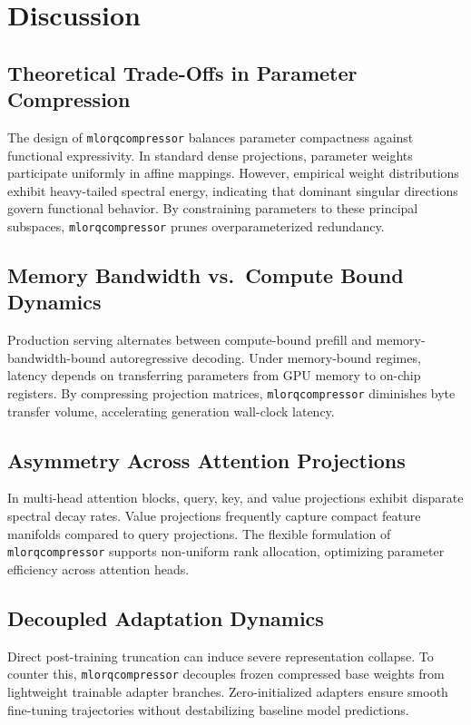 \section{Discussion}

\subsection{Theoretical Trade-Offs in Parameter Compression}
The design of \texttt{mlorqcompressor} balances parameter compactness against functional expressivity. In standard dense projections, parameter weights participate uniformly in affine mappings. However, empirical weight distributions exhibit heavy-tailed spectral energy, indicating that dominant singular directions govern functional behavior. By constraining parameters to these principal subspaces, \texttt{mlorqcompressor} prunes overparameterized redundancy.

\subsection{Memory Bandwidth vs.\ Compute Bound Dynamics}
Production serving alternates between compute-bound prefill and memory-bandwidth-bound autoregressive decoding. Under memory-bound regimes, latency depends on transferring parameters from GPU memory to on-chip registers. By compressing projection matrices, \texttt{mlorqcompressor} diminishes byte transfer volume, accelerating generation wall-clock latency.

\subsection{Asymmetry Across Attention Projections}
In multi-head attention blocks, query, key, and value projections exhibit disparate spectral decay rates. Value projections frequently capture compact feature manifolds compared to query projections. The flexible formulation of \texttt{mlorqcompressor} supports non-uniform rank allocation, optimizing parameter efficiency across attention heads.

\subsection{Decoupled Adaptation Dynamics}
Direct post-training truncation can induce severe representation collapse. To counter this, \texttt{mlorqcompressor} decouples frozen compressed base weights from lightweight trainable adapter branches. Zero-initialized adapters ensure smooth fine-tuning trajectories without destabilizing baseline model predictions.

